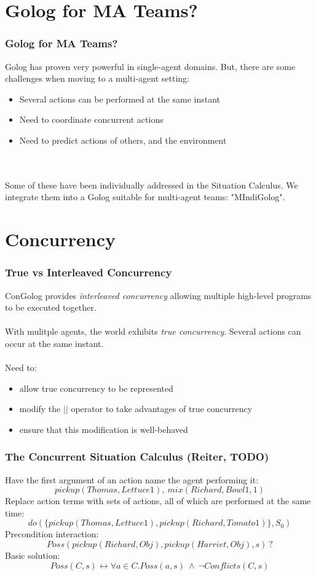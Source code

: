 \documentclass{beamer}
\begin{document}
\section{Golog for MA Teams?}

\begin{frame}
\frametitle{Golog for MA Teams?}
Golog has proven very powerful in single-agent domains.  But, there are
some challenges when moving to a multi-agent setting:
\begin{itemize}
  \pause
  \item Several actions can be performed at the same instant
  \pause
  \item Need to coordinate concurrent actions
  \pause
  \item Need to predict actions of others, and the environment
\end{itemize}
\ \\
\ \\
\pause
Some of these have been individually addressed in the Situation Calculus.
We integrate them into a Golog suitable for multi-agent teams: "MIndiGolog".

\end{frame}

\section{Concurrency}

\begin{frame}
\frametitle{True vs Interleaved Concurrency}
ConGolog provides \emph{interleaved concurrency} allowing multiple
high-level programs to be executed together.\\
\ \\
With mulitple agents, the world exhibits \emph{true concurrency}. Several
actions can occur at the same instant.\\
\ \\
\pause
Need to:
\begin{itemize}
  \item allow true concurrency to be represented
  \item modify the $||$ operator to take advantages of true concurrency
  \item ensure that this modification is well-behaved
\end{itemize}
\end{frame}

\begin{frame}
\frametitle{The Concurrent Situation Calculus (Reiter, TODO)}
Have the first argument of an action name the agent performing it:\[
pickup(Thomas,Lettuce1),\ mix(Richard,Bowl1,1)\]
\pause
Replace action terms with sets of actions, all of which are performed
at the same time:\[
do(\{pickup(Thomas,Lettuce1),pickup(Richard,Tomato1)\},S_0)\]
\pause
Precondition interaction:\[
Poss({pickup(Richard,Obj),pickup(Harriet,Obj)},s)\ ?\]
\pause
Basic solution:\[
Poss(C,s) \leftrightarrow \forall a \in C.Poss(a,s)\ \wedge\ \neg Conflicts(C,s)\]
\end{frame}
\end{document}
